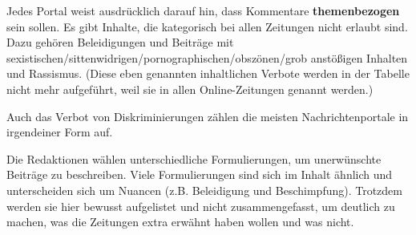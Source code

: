 Jedes Portal weist ausdrücklich darauf hin, dass Kommentare {\bfseries
themenbezogen} sein sollen.  Es gibt Inhalte, die kategorisch bei allen
Zeitungen nicht erlaubt sind. Dazu gehören Beleidigungen und Beiträge mit
sexistischen/sittenwidrigen/pornographischen/obszönen/grob anstößigen Inhalten
und Rassismus. (Diese eben genannten inhaltlichen Verbote werden in der Tabelle
nicht mehr aufgeführt, weil sie in allen Online-Zeitungen genannt werden.)

Auch das Verbot von Diskriminierungen zählen die meisten Nachrichtenportale in
irgendeiner Form auf.

Die Redaktionen wählen unterschiedliche Formulierungen, um unerwünschte Beiträge
zu beschreiben. Viele Formulierungen sind sich im Inhalt ähnlich  und
unterscheiden sich um Nuancen (z.B. Beleidigung und Beschimpfung). Trotzdem
werden sie hier bewusst aufgelistet und nicht zusammengefasst, um deutlich zu
machen, was die Zeitungen extra erwähnt haben wollen und was nicht.


